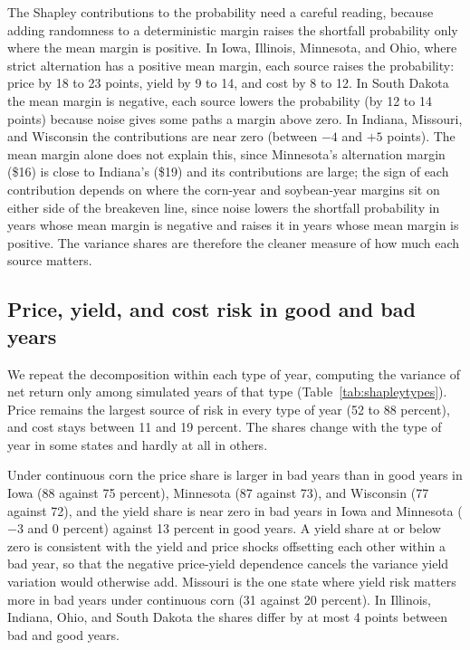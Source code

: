 \documentclass[11pt,letterpaper]{article}
\theoremstyle{remark}
\begin{document}
The Shapley contributions to the probability need a careful reading, because adding randomness to a deterministic margin raises the shortfall probability only where the mean margin is positive. In Iowa, Illinois, Minnesota, and Ohio, where strict alternation has a positive mean margin, each source raises the probability: price by 18 to 23 points, yield by 9 to 14, and cost by 8 to 12. In South Dakota the mean margin is negative, each source lowers the probability (by 12 to 14 points) because noise gives some paths a margin above zero. In Indiana, Missouri, and Wisconsin the contributions are near zero (between $-4$ and $+5$ points). The mean margin alone does not explain this, since Minnesota's alternation margin (\$16) is close to Indiana's (\$19) and its contributions are large; the sign of each contribution depends on where the corn-year and soybean-year margins sit on either side of the breakeven line, since noise lowers the shortfall probability in years whose mean margin is negative and raises it in years whose mean margin is positive. The variance shares are therefore the cleaner measure of how much each source matters.

\subsection{Price, yield, and cost risk in good and bad years}

\begin{table}[H]
\centering
\caption{Shapley shares of the variance of net return within bad and good years (percent, medium zone). Shares are over the random part of net return; cost accounts for the remainder (11 to 19 percent in every state and type of year).}
\label{tab:shapleytypes}

\end{table}

We repeat the decomposition within each type of year, computing the variance of net return only among simulated years of that type (Table~\ref{tab:shapleytypes}). Price remains the largest source of risk in every type of year (52 to 88 percent), and cost stays between 11 and 19 percent. The shares change with the type of year in some states and hardly at all in others.

Under continuous corn the price share is larger in bad years than in good years in Iowa (88 against 75 percent), Minnesota (87 against 73), and Wisconsin (77 against 72), and the yield share is near zero in bad years in Iowa and Minnesota ($-3$ and 0 percent) against 13 percent in good years. A yield share at or below zero is consistent with the yield and price shocks offsetting each other within a bad year, so that the negative price-yield dependence cancels the variance yield variation would otherwise add. Missouri is the one state where yield risk matters more in bad years under continuous corn (31 against 20 percent). In Illinois, Indiana, Ohio, and South Dakota the shares differ by at most 4 points between bad and good years.
\end{document}
